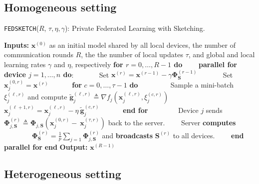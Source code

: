\subsection{Homogeneous setting}
\begin{algorithm}[H]
\caption{\texttt{FEDSKETCH}($R$, $\tau, \eta, \gamma$): Private Federated Learning with Sketching. }\label{Alg:PFLHom}
\begin{algorithmic}[1]
\State \textbf{Inputs:} $\boldsymbol{x}^{(0)}$ as an initial  model shared by all local devices, the number of communication rounds $R$, the the number of local updates $\tau$, and global and local learning rates $\gamma$ and $\eta$, respectively
\State \textbf{for $r=0, \ldots, R-1$ do}
\State $\qquad$\textbf{parallel for device $j=1,\ldots,n$ do}:
\State $\qquad\quad$ Set $\boldsymbol{x}^{(r)}=\boldsymbol{x}^{(r-1)}-\gamma{\mathbf{\Phi}}_{\mathbf{S}}^{(r-1)}$
\State $\qquad\quad$ Set $\boldsymbol{x}_j^{(0,r)}=\boldsymbol{x}^{(r)}$ 
\State $\qquad\quad $\textbf{for} $c=0,\ldots,\tau-1$ \textbf{do}
\State $\qquad\quad\quad$ Sample a mini-batch $\xi_j^{(\ell,r)}$ and compute $\tilde{\mathbf{g}}_{j}^{(\ell,r)}\triangleq\nabla{f}_j(\boldsymbol{x}^{(\ell,r)}_j,\xi_j^{(c,r)})$
\State $\qquad\quad\quad$ $\boldsymbol{x}^{(\ell+1,r)}_{j}=\boldsymbol{x}^{(\ell,r)}_j-\eta~ \tilde{\mathbf{g}}_{j}^{(c,r)}$ \label{eq:update-rule-alg}
\State $\qquad\quad$\textbf{end for}
\State $\qquad\quad\quad$Device $j$ sends $\mathbf{\Phi}^{(r)}_{j,\mathbf{S}}\triangleq\mathbf{\Phi}_{j,\mathbf{S}}\left(\boldsymbol{x}_j^{(0,r)}-~{\boldsymbol{x}}_{j}^{(\tau,r)}\right)$ back to the server.
\State $\qquad$Server \textbf{computes} 
\State $\qquad\qquad {\mathbf{\Phi}}^{(r)}_{\mathbf{S}}=\frac{1}{p}\sum_{j=1}\mathbf{\Phi}^{(r)}_{j,\mathbf{S}}$ and \textbf{broadcasts} ${\mathbf{S}}^{(r)}$ to all devices.
\State $\qquad$\textbf{end parallel for}
\State \textbf{end}
\State \textbf{Output:} ${\boldsymbol{x}}^{(R-1)}$
\vspace{- 0.1cm}
\end{algorithmic}
\end{algorithm}

\subsection{Heterogeneous setting}

